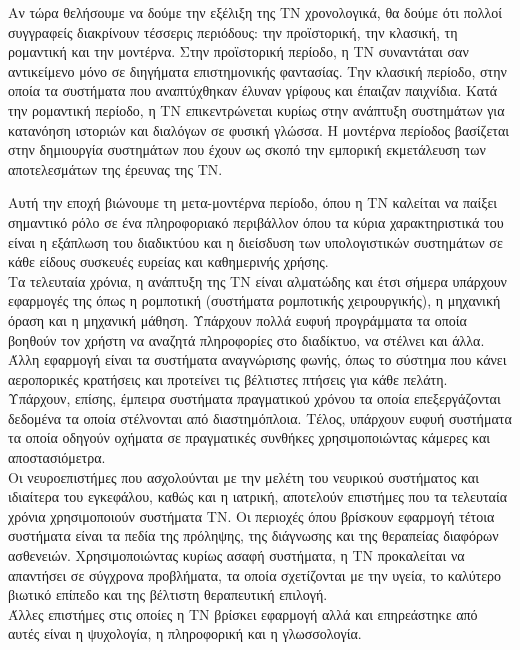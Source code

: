 Αν τώρα θελήσουμε να δούμε την εξέλιξη της ΤΝ χρονολογικά, 
θα δούμε ότι πολλοί συγγραφείς διακρίνουν τέσσερις περιόδους: 
την προϊστορική, την κλασική, τη ρομαντική και την μοντέρνα. Στην
προϊστορική περίοδο, η ΤΝ συναντάται σαν αντικείμενο μόνο σε διηγήματα
επιστημονικής φαντασίας. Την κλασική περίοδο, στην οποία τα συστήματα που
αναπτύχθηκαν έλυναν γρίφους και έπαιζαν παιχνίδια. Κατά την ρομαντική
περίοδο, η ΤΝ επικεντρώνεται κυρίως στην ανάπτυξη συστημάτων για
κατανόηση ιστοριών και διαλόγων σε φυσική γλώσσα. Η μοντέρνα περίοδος 
βασίζεται στην δημιουργία συστημάτων που έχουν ως σκοπό την εμπορική
εκμετάλευση των αποτελεσμάτων της έρευνας της ΤΝ.

Αυτή την εποχή βιώνουμε τη μετα-μοντέρνα περίοδο, όπου η TN
καλείται να παίξει σημαντικό ρόλο σε ένα πληροφοριακό περιβάλλον  
όπου τα κύρια χαρακτηριστικά του είναι η εξάπλωση του διαδικτύου και η διείσδυση των 
υπολογιστικών  συστημάτων  σε  κάθε  είδους  συσκευές  ευρείας  και  καθημερινής χρήσης. \\

Τα τελευταία χρόνια, η ανάπτυξη της ΤΝ είναι αλματώδης και έτσι σήμερα υπάρχουν 
εφαρμογές της όπως η ρομποτική (συστήματα ρομποτικής χειρουργικής), η μηχανική όραση και η μηχανική μάθηση. 
Υπάρχουν πολλά ευφυή προγράμματα τα οποία βοηθούν τον χρήστη να αναζητά
πληροφορίες στο διαδίκτυο, να στέλνει {} και άλλα. 
Άλλη εφαρμογή είναι τα συστήματα αναγνώρισης φωνής, όπως το σύστημα {}
που κάνει αεροπορικές κρατήσεις και προτείνει τις βέλτιστες πτήσεις για κάθε
πελάτη. Υπάρχουν, επίσης, έμπειρα συστήματα πραγματικού χρόνου τα οποία
επεξεργάζονται δεδομένα τα οποία στέλνονται από διαστημόπλοια. 
Τέλος, υπάρχουν ευφυή συστήματα τα οποία οδηγούν οχήματα σε πραγματικές συνθήκες 
χρησιμοποιώντας κάμερες και αποστασιόμετρα. \\

Οι νευροεπιστήμες που ασχολούνται με την μελέτη του νευρικού συστήματος και ιδιαίτερα του εγκεφάλου,
καθώς και η ιατρική, αποτελούν επιστήμες που τα τελευταία χρόνια χρησιμοποιούν συστήματα ΤΝ. 
Οι περιοχές όπου βρίσκουν εφαρμογή τέτοια συστήματα είναι τα πεδία της πρόληψης, 
της διάγνωσης και της θεραπείας διαφόρων ασθενειών. 
Χρησιμοποιώντας κυρίως ασαφή συστήματα, η ΤΝ προκαλείται να 
απαντήσει σε σύγχρονα προβλήματα, τα οποία σχετίζονται με την υγεία, 
το καλύτερο βιωτικό επίπεδο και της βέλτιστη θεραπευτική επιλογή. \\

Άλλες επιστήμες στις οποίες η ΤΝ βρίσκει εφαρμογή αλλά και επηρεάστηκε από αυτές είναι η ψυχολογία, η πληροφορική και η γλωσσολογία. \\


